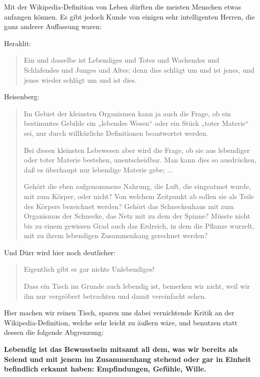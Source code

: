 \documentclass[12pt]{book}
\begin{document}
Mit der Wikipedia-Definition von Leben dürften die meisten Menschen etwas anfangen können. Es gibt jedoch Kunde von einigen sehr intelligenten Herren, die ganz anderer Auffassung waren:

Heraklit:
\begin{quote}\begin{tcolorbox}
Ein und dasselbe ist Lebendiges und Totes und Wachendes und Schlafendes und Junges und Altes; denn dies schlägt um und ist jenes, und jenes wieder schlägt um und ist dies.
\end{tcolorbox}\end{quote}
Heisenberg:
\begin{quote}\begin{tcolorbox}
Im Gebiet der kleinsten Organismen kann ja auch die Frage, ob ein bestimmtes Gebilde ein „lebendes Wesen“ oder ein Stück „toter Materie“ sei, nur durch willkürliche Definitionen beantwortet werden.

Bei diesen kleinsten Lebewesen aber wird die Frage, ob sie aus lebendiger oder toter Materie bestehen, unentscheidbar. Man kann dies so ausdrücken, daß es überhaupt nur lebendige Materie gebe; ...

Gehört die eben aufgenommene Nahrung, die Luft, die eingeatmet wurde, mit zum Körper, oder nicht? Von welchem Zeitpunkt ab sollen sie als Teile des Körpers bezeichnet werden? Gehört das Schneckenhaus mit zum Organismus der Schnecke, das Netz mit zu dem der Spinne? Müsste nicht bis zu einem gewissen Grad auch das Erdreich, in dem die Pflanze wurzelt, mit zu ihrem lebendigen Zusammenhang gerechnet werden?
\end{tcolorbox}\end{quote}

Und Dürr wird hier noch deutlicher:
\begin{quote}\begin{tcolorbox}
Eigentlich gibt es gar nichts Unlebendiges!

Dass ein Tisch im Grunde auch lebendig ist, bemerken wir nicht, weil wir ihn nur vergröbert betrachten und damit vereinfacht sehen.
\end{tcolorbox}\end{quote}

Hier machen wir reinen Tisch, sparen uns dabei vernichtende Kritik an der Wikipedia-Definition, welche sehr leicht zu äußern wäre, und benutzen statt dessen die folgende Abgrenzung:

\textbf{Lebendig ist das Bewusstsein mitsamt all dem, was wir bereits als Seiend und mit jenem im Zusammenhang stehend oder gar in Einheit befindlich erkannt haben: Empfindungen, Gefühle, Wille.} 
\end{document}

